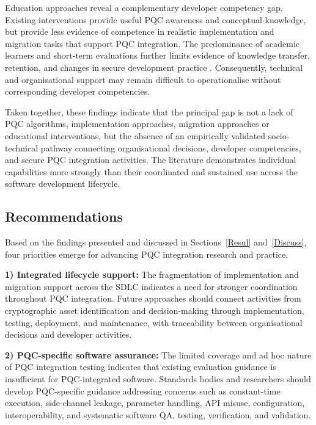 \documentclass[letterpaper,twocolumn,10pt]{article}
\begin{document}
Education approaches reveal a complementary developer competency gap. Existing interventions provide useful PQC awareness and conceptual knowledge, but provide less evidence of competence in realistic implementation and migration tasks that support PQC integration. The predominance of academic learners and short-term evaluations further limits evidence of knowledge transfer, retention, and changes in secure development practice \cite{Ana_borrelli_towards_2025, Ana_borrelli_designing_2024, Ana_PQCLabEdu, Ana_abdelhamid_wip_2024}. Consequently, technical and organisational support may remain difficult to operationalise without corresponding developer competencies.

Taken together, these findings indicate that the principal gap is not a lack of PQC algorithms, implementation approaches, migration approaches or educational interventions, but the absence of an empirically validated socio-technical pathway connecting organisational decisions, developer competencies, and secure PQC integration activities. The literature demonstrates individual capabilities more strongly than their coordinated and sustained use across the software development lifecycle.

\subsection{Recommendations}
\label{DisResearchD}

Based on the findings presented and discussed in Sections~\ref{Resul} and~\ref{Discuss}, four priorities emerge for advancing PQC integration research and practice.

\textbf{1) Integrated lifecycle support:} The fragmentation of implementation and migration support across the SDLC indicates a need for stronger coordination throughout PQC integration. Future approaches should connect activities from cryptographic asset identification and decision-making through implementation, testing, deployment, and maintenance, with traceability between organisational decisions and developer activities.

\textbf{2) PQC-specific software assurance:} The limited coverage and ad hoc nature of PQC integration testing indicates that existing evaluation guidance is insufficient for PQC-integrated software. Standards bodies and researchers should develop PQC-specific guidance addressing concerns such as constant-time execution, side-channel leakage, parameter handling, API misuse, configuration, interoperability, and systematic software QA, testing, verification, and validation.
\end{document}
